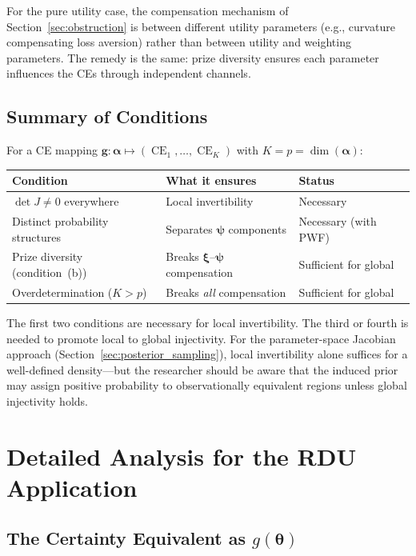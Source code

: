 \documentclass[11pt,a4paper]{article}
\theoremstyle{definition}
\newcommand{\btheta}{\boldsymbol{\theta}}
\DeclareMathOperator{\CE}{CE}
\begin{document}
\noindent
For the pure utility case, the compensation mechanism of
Section~\ref{sec:obstruction} is between different utility parameters (e.g.,
curvature compensating loss aversion) rather than between utility and weighting
parameters. The remedy is the same: prize diversity ensures each parameter
influences the CEs through independent channels.

\subsection{Summary of Conditions}

For a CE mapping $\mathbf{g}: \bm{\alpha} \mapsto (\CE_1, \ldots, \CE_K)$
with $K = p = \dim(\bm{\alpha})$:
\begin{center}
\begin{tabular}{lll}
    \textbf{Condition} & \textbf{What it ensures} & \textbf{Status} \\ \hline
    $\det J \neq 0$ everywhere & Local invertibility & Necessary \\
    Distinct probability structures & Separates $\bm{\psi}$ components &
        Necessary (with PWF) \\
    Prize diversity (condition~(b)) & Breaks $\bm{\xi}$--$\bm{\psi}$
        compensation & Sufficient for global \\
    Overdetermination ($K > p$) & Breaks \emph{all} compensation &
        Sufficient for global \\
\end{tabular}
\end{center}
The first two conditions are necessary for local invertibility. The third or
fourth is needed to promote local to global injectivity. For the parameter-space
Jacobian approach (Section~\ref{sec:posterior_sampling}), local invertibility
alone suffices for a well-defined density---but the researcher should be aware
that the induced prior may assign positive probability to observationally
equivalent regions unless global injectivity holds.



\section{Detailed Analysis for the RDU Application}

\subsection{The Certainty Equivalent as \texorpdfstring{$g(\btheta)$}{g(theta)}}
\end{document}
